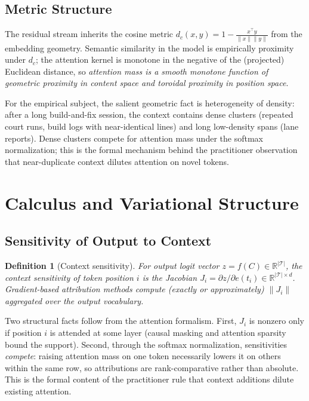 \documentclass[11pt]{article}
\newtheorem{definition}[theorem]{Definition}
\begin{document}
\subsection{Metric Structure}

The residual stream inherits the cosine metric
$d_c(x, y) = 1 - \frac{x^\top y}{\|x\| \|y\|}$ from the embedding geometry.
Semantic similarity in the model is empirically proximity under $d_c$;
the attention kernel is monotone in the negative of the (projected) Euclidean
distance, so \emph{attention mass is a smooth monotone function of geometric
proximity in content space and toroidal proximity in position space}.

For the empirical subject, the salient geometric fact is heterogeneity of
density: after a long build-and-fix session, the context contains dense
clusters (repeated court runs, build logs with near-identical lines) and long
low-density spans (lane reports). Dense clusters compete for attention mass
under the softmax normalization; this is the formal mechanism behind the
practitioner observation that near-duplicate context dilutes attention on
novel tokens.

\section{Calculus and Variational Structure}\label{sec:calculus}

\subsection{Sensitivity of Output to Context}

\begin{definition}[Context sensitivity]
For output logit vector $z = f(C) \in \mathbb{R}^{|\mathcal{T}|}$, the
context sensitivity of token position $i$ is the Jacobian
$J_i = \partial z / \partial e(t_i) \in \mathbb{R}^{|\mathcal{T}| \times d}$.
Gradient-based attribution methods compute (exactly or approximately)
$\|J_i\|$ aggregated over the output vocabulary.
\end{definition}

Two structural facts follow from the attention formalism. First, $J_i$ is
nonzero only if position $i$ is attended at some layer (causal masking and
attention sparsity bound the support). Second, through the softmax
normalization, sensitivities \emph{compete}: raising attention mass on one
token necessarily lowers it on others within the same row, so attributions
are rank-comparative rather than absolute. This is the formal content of the
practitioner rule that context additions dilute existing attention.
\end{document}
